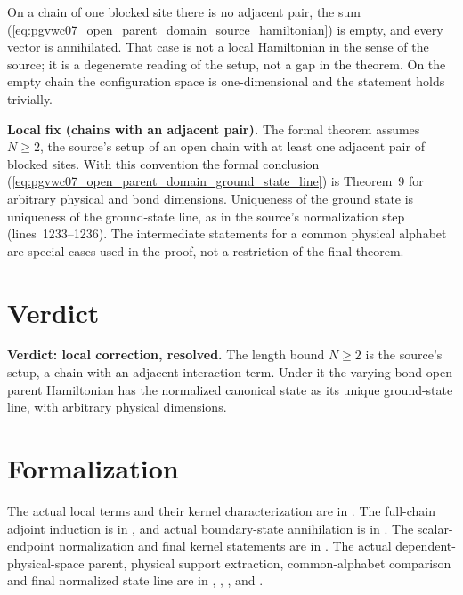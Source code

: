 \documentclass{article}
\begin{document}
On a chain of one blocked site there is no adjacent pair, the sum
(\ref{eq:pgvwc07_open_parent_domain_source_hamiltonian}) is empty, and every
vector is annihilated. That case is not a local Hamiltonian in the sense of the
source; it is a degenerate reading of the setup, not a gap in the theorem. On
the empty chain the configuration space is one-dimensional and the
statement holds trivially.

\textbf{Local fix (chains with an adjacent pair).} The formal theorem assumes
$N\ge2$, the source's setup of an open chain with at least one adjacent pair of
blocked sites. With this convention the formal conclusion
(\ref{eq:pgvwc07_open_parent_domain_ground_state_line}) is Theorem~9 for
arbitrary physical and bond dimensions. Uniqueness of the ground state is
uniqueness of the ground-state line, as in the source's normalization step
(lines~1233--1236). The intermediate statements for a common physical alphabet
are special cases used in the proof, not a restriction of the final theorem.

\section{Verdict}
\textbf{Verdict: local correction, resolved.} The length bound $N\ge2$ is the
source's setup, a chain with an adjacent interaction term. Under it the
varying-bond open parent Hamiltonian has the normalized canonical state as its
unique ground-state line, with arbitrary physical dimensions.

\section{Formalization}
The actual local terms and their kernel characterization are in
.
The full-chain adjoint induction is in
,
and actual boundary-state annihilation is in
.
The scalar-endpoint normalization and final kernel statements are in
.
The actual dependent-physical-space parent, physical support extraction,
common-alphabet comparison and final normalized state line are in
,
,
, and
.



\end{document}
